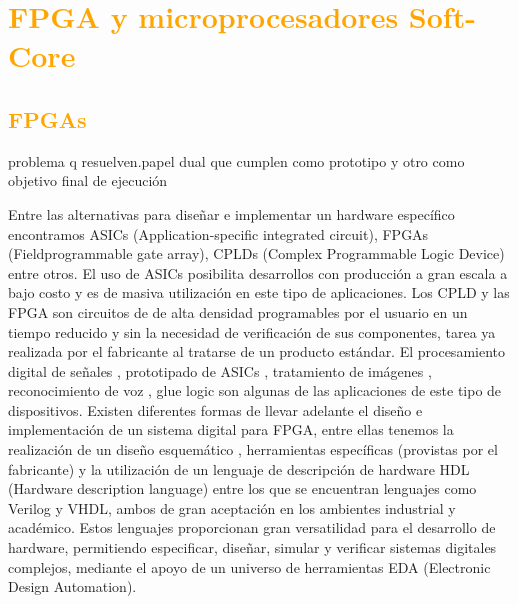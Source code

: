 \documentclass[a4paper,11pt]{article}
\begin{document}

\section{\textcolor{orange}{FPGA y microprocesadores Soft-Core}}%
	\subsection{\textcolor{orange}{FPGAs}}
 problema q resuelven.papel dual que cumplen como prototipo y otro como objetivo final de ejecución 


Entre las alternativas para diseñar e implementar un hardware específico encontramos ASICs (Application-specific integrated circuit), FPGAs (Fieldprogrammable
gate array), CPLDs (Complex Programmable Logic Device) entre otros.
El uso de ASICs posibilita desarrollos con producción a gran escala a bajo costo y es de masiva utilización en este tipo de aplicaciones. Los CPLD y las FPGA son circuitos de de alta densidad programables por el usuario en un tiempo reducido y sin la necesidad de verificación de sus componentes, tarea ya realizada por el fabricante al tratarse de un
producto estándar. El procesamiento digital de señales , prototipado de ASICs , tratamiento de imágenes , reconocimiento de voz , glue logic son algunas de las aplicaciones
de este tipo de dispositivos. Existen diferentes formas de llevar adelante el diseño e implementación de un sistema digital para FPGA, entre ellas tenemos la realización de un
diseño esquemático , herramientas específicas (provistas por el fabricante) y la utilización de un lenguaje de descripción de hardware HDL (Hardware description language) entre los que se encuentran lenguajes como Verilog y VHDL, ambos de gran aceptación en los ambientes industrial y académico. Estos lenguajes proporcionan gran versatilidad para
el desarrollo de hardware, permitiendo especificar, diseñar, simular y verificar sistemas digitales complejos, mediante el apoyo de un universo de herramientas EDA (Electronic
Design Automation).
\end{document}
